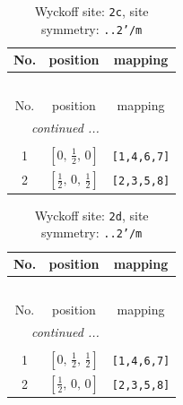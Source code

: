 \documentclass[fleqn,8pt]{jsarticle}
\begin{document}
\renewcommand{\arraystretch}{1.2}
\begin{longtable}{ccc}
\caption{Wyckoff site: {\tt 2c}, site symmetry: {\tt ..2'/m}}
 \\
 \hline \hline
No. & position & mapping \\ \hline \endfirsthead

\multicolumn{2}{l}{\tablename\ \thetable{}} \\
 \hline \hline
No. & position & mapping \\ \hline \endhead

 \hline \hline
\multicolumn{2}{r}{\footnotesize\it continued ...} \\ \endfoot

 \hline \hline
\multicolumn{2}{r}{} \\ \endlastfoot

1 & $\left[ 0,\, \frac{1}{2},\, 0 \right]$ & {\tt [1,4,6,7]} \\ \hline
2 & $\left[ \frac{1}{2},\, 0,\, \frac{1}{2} \right]$ & {\tt [2,3,5,8]} \\
\end{longtable}
\renewcommand{\arraystretch}{1.2}
\begin{longtable}{ccc}
\caption{Wyckoff site: {\tt 2d}, site symmetry: {\tt ..2'/m}}
 \\
 \hline \hline
No. & position & mapping \\ \hline \endfirsthead

\multicolumn{2}{l}{\tablename\ \thetable{}} \\
 \hline \hline
No. & position & mapping \\ \hline \endhead

 \hline \hline
\multicolumn{2}{r}{\footnotesize\it continued ...} \\ \endfoot

 \hline \hline
\multicolumn{2}{r}{} \\ \endlastfoot

1 & $\left[ 0,\, \frac{1}{2},\, \frac{1}{2} \right]$ & {\tt [1,4,6,7]} \\ \hline
2 & $\left[ \frac{1}{2},\, 0,\, 0 \right]$ & {\tt [2,3,5,8]} \\
\end{longtable}
\renewcommand{\arraystretch}{1.2}
\end{document}
